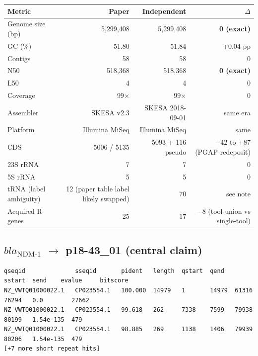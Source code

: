 \documentclass[11pt]{article}
\begin{document}
\begin{center}
\begin{tabular}{@{}lrrr@{}}
\toprule
Metric & Paper & Independent & $\Delta$ \\
\midrule
Genome size (bp)        & 5{,}299{,}408 & 5{,}299{,}408 & \textbf{0 (exact)} \\
GC (\%)                 & 51.80         & 51.84         & +0.04 pp \\
Contigs                 & 58            & 58            & 0 \\
N50                     & 518{,}368     & 518{,}368     & \textbf{0 (exact)} \\
L50                     & 4             & 4             & 0 \\
Coverage                & 99$\times$    & 99$\times$    & 0 \\
Assembler               & SKESA v2.3    & SKESA 2018-09-01 & same era \\
Platform                & Illumina MiSeq& Illumina MiSeq& same \\
CDS                     & 5006 / 5135   & 5093 + 116 pseudo & $-42$ to $+87$ (PGAP redeposit) \\
23S rRNA                & 7             & 7             & 0 \\
5S  rRNA                & 5             & 5             & 0 \\
tRNA (label ambiguity)  & 12 (paper table label likely swapped) & 70 & see note \\
Acquired R genes        & 25            & 17            & $-8$ (tool-union vs single-tool) \\
\bottomrule
\end{tabular}
\end{center}

\subsection{$bla_{\text{NDM-1}}$ $\to$ p18-43\_01 (central claim)}

\begin{lstlisting}[caption={BLAST tabular (outfmt 6): NZ_VWTQ01000022.1 (14,979 bp) vs CP023554.1 (212,326 bp)}]
qseqid              sseqid       pident   length  qstart  qend   sstart  send    evalue     bitscore
NZ_VWTQ01000022.1   CP023554.1   100.000  14979   1       14979  61316   76294   0.0        27662
NZ_VWTQ01000022.1   CP023554.1   99.618   262     7338    7599   79938   80199   1.54e-135  479
NZ_VWTQ01000022.1   CP023554.1   98.885   269     1138    1406   79939   80206   1.54e-135  479
[+7 more short repeat hits]
\end{lstlisting}
\end{document}
